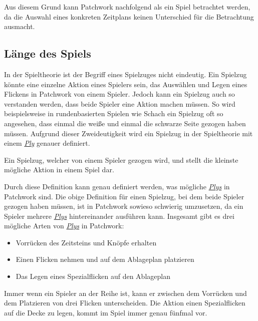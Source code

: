 Aus diesem Grund kann Patchwork nachfolgend als ein Spiel betrachtet werden, da die Auswahl eines konkreten Zeitplans keinen Unterschied für die Betrachtung ausmacht.

\subsection*{Länge des Spiels}

In der Spieltheorie ist der Begriff eines Spielzuges nicht eindeutig. Ein Spielzug könnte eine einzelne Aktion eines Spielers sein, \zB das Auswählen und Legen eines Flickens in Patchwork von einem Spieler. Jedoch kann ein Spielzug auch so verstanden werden, dass beide Spieler eine Aktion machen müssen. So wird beispielsweise in rundenbasierten Spielen wie Schach ein Spielzug oft so angesehen, dass einmal die weiße und einmal die schwarze Seite gezogen haben müssen. Aufgrund dieser Zweideutigkeit wird ein Spielzug in der Spieltheorie mit einem \hyperref[text:ply]{\emph{Ply}} genauer definiert.

\begin{defStrich}[Ply]
    Ein Spielzug, welcher von einem Spieler gezogen wird, und stellt die kleinste mögliche Aktion in einem Spiel dar. \cite[S. 213]{1959.GameTheoryStudiesCheckers}
\end{defStrich}
\label{text:ply}
\vspace{-0.2cm}

Durch diese Definition kann genau definiert werden, was mögliche \hyperref[text:ply]{\emph{Plys}} in Patchwork sind. Die obige Definition für einen Spielzug, bei dem beide Spieler gezogen haben müssen, ist in Patchwork sowieso schwierig umzusetzen, da ein Spieler mehrere \hyperref[text:ply]{\emph{Plys}} hintereinander ausführen kann. Insgesamt gibt es drei mögliche Arten von \hyperref[text:ply]{\emph{Plys}} in Patchwork:

\begin{itemize}
    \item Vorrücken des Zeitsteins und Knöpfe erhalten
    \item Einen Flicken nehmen und auf dem Ablageplan platzieren
    \item Das Legen eines Spezialflicken auf den Ablageplan
\end{itemize}

Immer wenn ein Spieler an der Reihe ist, kann er zwischen dem Vorrücken und dem Platzieren von drei Flicken unterscheiden. Die Aktion einen Spezialflicken auf die Decke zu legen, kommt im Spiel immer genau fünfmal vor.

